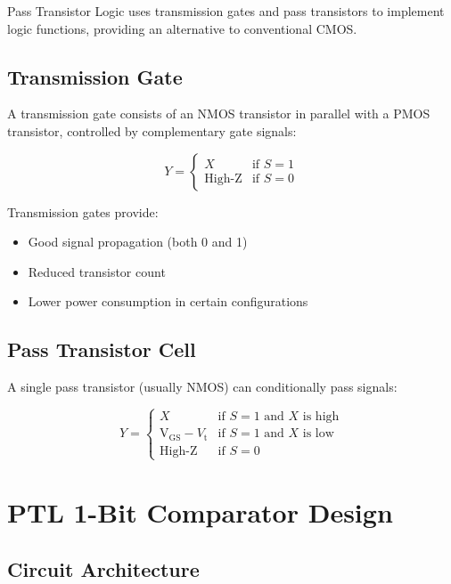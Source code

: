 \documentclass[12pt,a4paper,twoside]{report}
\begin{document}
Pass Transistor Logic uses transmission gates and pass transistors to implement logic functions, providing an alternative to conventional CMOS.

\subsection{Transmission Gate}

A transmission gate consists of an NMOS transistor in parallel with a PMOS transistor, controlled by complementary gate signals:

\begin{equation}
Y = \begin{cases}
X & \text{if } S = 1 \\
\text{High-Z} & \text{if } S = 0
\end{cases}
\end{equation}

Transmission gates provide:
\begin{itemize}
    \item Good signal propagation (both 0 and 1)
    \item Reduced transistor count
    \item Lower power consumption in certain configurations
\end{itemize}

\subsection{Pass Transistor Cell}

A single pass transistor (usually NMOS) can conditionally pass signals:

\begin{equation}
Y = \begin{cases}
X & \text{if } S = 1 \text{ and } X \text{ is high} \\
\text{V}_{\text{GS}} - V_{\text{t}} & \text{if } S = 1 \text{ and } X \text{ is low} \\
\text{High-Z} & \text{if } S = 0
\end{cases}
\end{equation}

\section{PTL 1-Bit Comparator Design}

\subsection{Circuit Architecture}
\end{document}
